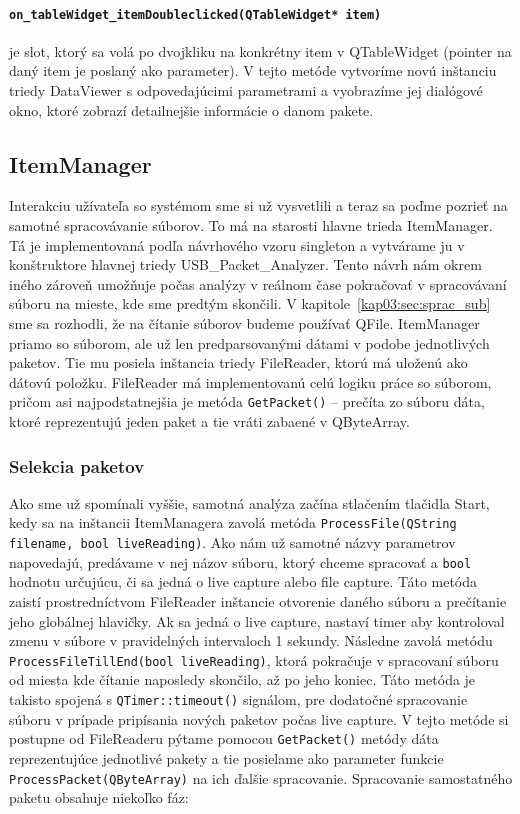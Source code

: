 \paragraph{\texttt{on\_tableWidget\_itemDoubleclicked(QTableWidget* item)}}
\label{kap04:sec:double_click}

je slot, ktorý sa volá po dvojkliku na konkrétny item v QTableWidget (pointer na daný item je poslaný ako parameter). V tejto metóde vytvoríme novú inštanciu triedy DataViewer s odpovedajúcimi parametrami a vyobrazíme jej dialógové okno, ktoré zobrazí detailnejšie informácie o danom pakete.

\subsection{ItemManager}
\label{kap04:sec:item_manager}
Interakciu užívateľa so systémom sme si už vysvetlili a teraz sa poďme pozrieť na samotné spracovávanie súborov. To má na starosti hlavne trieda ItemManager. Tá je implementovaná podľa návrhového vzoru singleton a vytvárame ju v konštruktore hlavnej triedy USB\_Packet\_Analyzer. Tento návrh nám okrem iného zároveň umožňuje počas analýzy v reálnom čase pokračovať v spracovávaní súboru na mieste, kde sme predtým skončili. V kapitole~\ref{kap03:sec:sprac_sub} sme sa rozhodli, že na čítanie súborov budeme používať QFile. ItemManager priamo so súborom, ale už len predparsovanými dátami v podobe jednotlivých paketov. Tie mu posiela inštancia triedy FileReader, ktorú má uloženú ako dátovú položku. FileReader má implementovanú celú logiku práce so súborom, pričom asi najpodstatnejšia je metóda \texttt{GetPacket()} -- prečíta zo súboru dáta, ktoré reprezentujú jeden paket a tie vráti zabaené v QByteArray.

\subsubsection{Selekcia paketov}

Ako sme už spomínali vyššie, samotná analýza začína stlačením tlačidla Start, kedy sa na inštancii ItemManagera zavolá metóda \texttt{ProcessFile(QString filename, bool liveReading)}. Ako nám už samotné názvy parametrov napovedajú, predávame v nej názov súboru, ktorý chceme spracovať a \texttt{bool} hodnotu určujúcu, či sa jedná o live capture alebo file capture. Táto metóda zaistí prostredníctvom FileReader inštancie otvorenie daného súboru a prečítanie jeho globálnej hlavičky. Ak sa jedná o live capture, nastaví timer aby kontroloval zmenu v súbore v pravidelných intervaloch 1 sekundy. Následne zavolá metódu \texttt{ProcessFileTillEnd(bool liveReading)}, ktorá pokračuje v spracovaní súboru od miesta kde čítanie naposledy skončilo, až po jeho koniec. Táto metóda je takisto spojená s \texttt{QTimer::timeout()} signálom, pre dodatočné spracovanie súboru v prípade pripísania nových paketov počas live capture. V tejto metóde si postupne od FileReaderu pýtame pomocou \texttt{GetPacket()} metódy dáta reprezentujúce jednotlivé pakety a tie posielame ako parameter funkcie \texttt{ProcessPacket(QByteArray)} na ich ďalšie spracovanie. Spracovanie samostatného paketu obsahuje niekoľko fáz:
